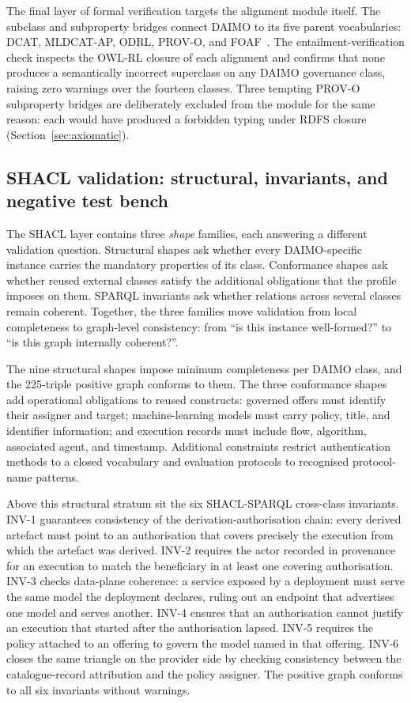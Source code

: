 \documentclass[11pt,a4paper]{article}
\begin{document}
The final layer of formal verification targets the alignment module itself. The subclass and subproperty bridges connect DAIMO to its five parent vocabularies: DCAT, MLDCAT-AP, ODRL, PROV-O, and FOAF~\cite{foaf}. The entailment-verification check inspects the OWL-RL closure of each alignment and confirms that none produces a semantically incorrect superclass on any DAIMO governance class, raising zero warnings over the fourteen classes. Three tempting PROV-O subproperty bridges are deliberately excluded from the module for the same reason: each would have produced a forbidden typing under RDFS closure (Section~\ref{sec:axiomatic}).

\subsection{SHACL validation: structural, invariants, and negative test bench}\label{sec:eval-invariants}

The SHACL layer contains three \emph{shape} families, each answering a different validation question. Structural shapes ask whether every DAIMO-specific instance carries the mandatory properties of its class. Conformance shapes ask whether reused external classes satisfy the additional obligations that the profile imposes on them. SPARQL invariants ask whether relations across several classes remain coherent. Together, the three families move validation from local completeness to graph-level consistency: from ``is this instance well-formed?'' to ``is this graph internally coherent?''.

The nine structural shapes impose minimum completeness per DAIMO class, and the 225-triple positive graph conforms to them. The three conformance shapes add operational obligations to reused constructs: governed offers must identify their assigner and target; machine-learning models must carry policy, title, and identifier information; and execution records must include flow, algorithm, associated agent, and timestamp. Additional constraints restrict authentication methods to a closed vocabulary and evaluation protocols to recognised protocol-name patterns.

Above this structural stratum sit the six SHACL-SPARQL cross-class invariants. INV-1 guarantees consistency of the derivation-authorisation chain: every derived artefact must point to an authorisation that covers precisely the execution from which the artefact was derived. INV-2 requires the actor recorded in provenance for an execution to match the beneficiary in at least one covering authorisation. INV-3 checks data-plane coherence: a service exposed by a deployment must serve the same model the deployment declares, ruling out an endpoint that advertises one model and serves another. INV-4 ensures that an authorisation cannot justify an execution that started after the authorisation lapsed. INV-5 requires the policy attached to an offering to govern the model named in that offering. INV-6 closes the same triangle on the provider side by checking consistency between the catalogue-record attribution and the policy assigner. The positive graph conforms to all six invariants without warnings.
\end{document}
